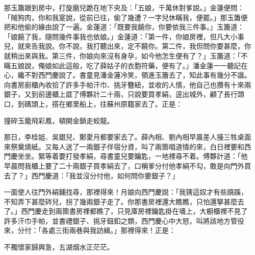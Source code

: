 那玉簫跟到房中，打旋磨兒跪在地下央及：「五娘，千萬休對爹說。」金蓮便問：「賊狗肉，你和我寔說，從前已往，偷了幾遭？一字兒休瞞我，便罷。」那玉簫便把和他偷的緣由說了一遍。金蓮道：「既要我饒你，你要依我三件事。」玉簫道：「娘饒了我，隨問幾件事我也依娘。」金蓮道：「第一件，你娘房裡，但凡大小事兒，就來告我說。你不說，我打聽出來，定不饒你。第二件，我但問你要甚麼，你就稍出來與我。第三件，你娘向來沒有身孕，如今他怎生便有了？」{}玉簫道：「不瞞五娘說，俺娘如此這般，吃了薛姑子的衣胞符藥，便有了。」潘金蓮一一聽記在心，纔不對西門慶說了。書童見潘金蓮冷笑，領進玉簫去了，知此事有幾分不諧。向書房廚櫃內收拾了許多手帕汗巾、挑牙簪紐，並收的人情，他自己也攢有十來兩銀子，又到前邊櫃上誆了傅夥計二十兩，只說要買孝絹，逕出城外，顧了長行頭口，到碼頭上，搭在鄉里船上，往蘇州原籍家去了。{}正是：

\begin{myquote} 
撞碎玉籠飛彩鳳，頓開金鎖走蛟龍。
\end{myquote} 

那日，李桂姐、吳銀兒、鄭愛月都要家去了。薛內相、劉內相早晨差人擡三牲桌面來祭奠燒紙。又每人送了一兩銀子伴宿分資，叫了兩箇唱道情的來，白日裡要和西門慶坐坐。緊等着要打發孝絹，尋書童兒要鑰匙，一地裡尋不着。傅夥計道：「他早晨問我櫃上要了二十兩銀子買孝絹去了，口稱爹分付他孝絹不勾，敢是向門外買去了？」西門慶道：「我並沒分付他，如何問你要銀子？」

一面使人往門外絹鋪找尋，那裡得來！月娘向西門慶說：「我猜這奴才有些蹺蹊，不知弄下甚麼硶兒，{}拐了幾兩銀子走了。你那書房裡還大瞧瞧，只怕還拏甚麼去了。」西門慶走到兩箇書房裡都瞧了，只見庫房裡鑰匙掛在墻上，大橱櫃裡不見了許多汗巾手帕，並書禮銀子、挑牙鈕釦之類，西門慶心中大怒，叫將該地方管役來，分付：「各處三街兩巷與我訪緝。」那裡得來！正是：

\begin{myquote} 
不獨懷家歸興急，五湖烟水正茫茫。
\end{myquote} 

